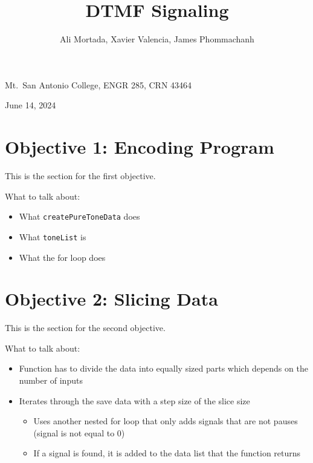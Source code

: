 \documentclass[12pt]{iopart}
\begin{document}
\title{DTMF Signaling}
\author{Ali Mortada, Xavier Valencia, James Phommachanh}
\vspace{10pt}
\begin{indented}
  \item[]Mt.~San Antonio College, ENGR 285, CRN 43464
  \item[]June 14, 2024
\end{indented}
\newpage

\section{Objective 1: Encoding Program}

This is the section for the first objective. \newline

What to talk about:
\begin{itemize}
    \item What \verb|createPureToneData| does
    \item What \verb|toneList| is
    \item What the for loop does
\end{itemize}



\pagebreak

\section{Objective 2: Slicing Data}

This is the section for the second objective. \newline

What to talk about:
\begin{itemize}
    \item Function has to divide the data into equally sized parts which depends on the number of inputs
    \item Iterates through the save data with a step size of the slice size
    \begin{itemize}
        \item Uses another nested for loop that only adds signals that are not pauses (signal is not equal to 0)
        \item If a signal is found, it is added to the data list that the function returns
    \end{itemize}
\end{itemize}
\end{document}
